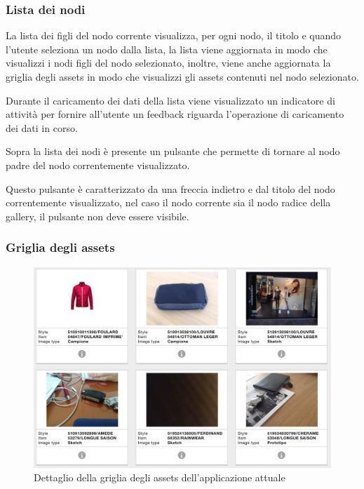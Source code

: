 \subsubsection{Lista dei nodi}


La lista dei figli del nodo corrente visualizza, per ogni nodo, il titolo e quando l'utente seleziona un nodo dalla lista, la lista viene aggiornata in modo che visualizzi i nodi figli del nodo selezionato, inoltre, viene anche aggiornata la griglia degli assets in modo che visualizzi gli assets contenuti nel nodo selezionato.

Durante il caricamento dei dati della lista viene visualizzato un indicatore di attività per fornire all'utente un feedback riguarda l'operazione di caricamento dei dati in corso.

Sopra la lista dei nodi è presente un pulsante che permette di tornare al nodo padre del nodo correntemente visualizzato.

Questo pulsante è caratterizzato da una freccia indietro e dal titolo del nodo correntemente visualizzato, nel caso il nodo corrente sia il nodo radice della gallery, il pulsante non deve essere visibile.

\subsubsection{Griglia degli assets}

\begin{figure}[htp]
\centering
\includegraphics[width=\textwidth]{../immagini/warda-gallery-griglia}
\caption{Dettaglio della griglia degli assets dell'applicazione attuale}  
\end{figure}

